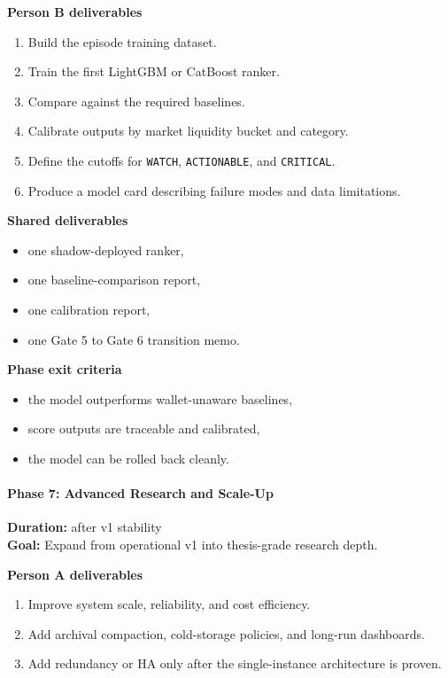 \documentclass[
]{article}
\providecommand{\tightlist}{%
  \setlength{\itemsep}{0pt}\setlength{\parskip}{0pt}}
\begin{document}
\textbf{Person B deliverables}

\begin{enumerate}
\def\labelenumi{\arabic{enumi}.}
\tightlist
\item
  Build the episode training dataset.
\item
  Train the first LightGBM or CatBoost ranker.
\item
  Compare against the required baselines.
\item
  Calibrate outputs by market liquidity bucket and category.
\item
  Define the cutoffs for \texttt{WATCH}, \texttt{ACTIONABLE}, and
  \texttt{CRITICAL}.
\item
  Produce a model card describing failure modes and data limitations.
\end{enumerate}

\textbf{Shared deliverables}

\begin{itemize}
\tightlist
\item
  one shadow-deployed ranker,
\item
  one baseline-comparison report,
\item
  one calibration report,
\item
  one Gate 5 to Gate 6 transition memo.
\end{itemize}

\textbf{Phase exit criteria}

\begin{itemize}
\tightlist
\item
  the model outperforms wallet-unaware baselines,
\item
  score outputs are traceable and calibrated,
\item
  the model can be rolled back cleanly.
\end{itemize}

\paragraph{Phase 7: Advanced Research and
Scale-Up}\label{phase-7-advanced-research-and-scale-up}

\textbf{Duration:} after v1 stability\\
\textbf{Goal:} Expand from operational v1 into thesis-grade research
depth.

\textbf{Person A deliverables}

\begin{enumerate}
\def\labelenumi{\arabic{enumi}.}
\tightlist
\item
  Improve system scale, reliability, and cost efficiency.
\item
  Add archival compaction, cold-storage policies, and long-run
  dashboards.
\item
  Add redundancy or HA only after the single-instance architecture is
  proven.
\end{enumerate}
\end{document}
